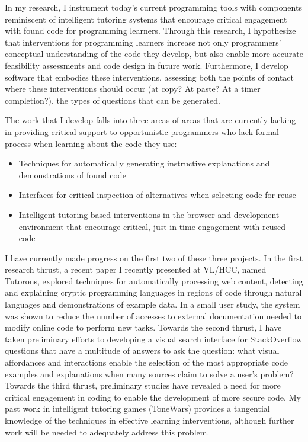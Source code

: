 \documentclass[12pt]{memoir}
\begin{document}
In my research, I instrument today's current programming tools with components reminiscent of intelligent tutoring systems that encourage critical engagement with found code for programming learners.
Through this research, I hypothesize that interventions for programming learners increase not only programmers' conceptual understanding of the code they develop, but also enable more accurate feasibility assessments and code design in future work.
Furthermore, I develop software that embodies these interventions, assessing both the points of contact where these interventions should occur (at copy? At paste? At a timer completion?), the types of questions that can be generated.

The work that I develop falls into three areas of areas that are currently lacking in providing critical support to opportunistic programmers who lack formal process when learning about the code they use:

\begin{itemize}
\item Techniques for automatically generating instructive explanations and demonstrations of found code
\item Interfaces for critical inspection of alternatives when selecting code for reuse
\item Intelligent tutoring-based interventions in the browser and development environment that encourage critical, just-in-time engagement with reused code
\end{itemize}

I have currently made progress on the first two of these three projects.
In the first research thrust, a recent paper I recently presented at VL/HCC, named Tutorons, explored techniques for automatically processing web content, detecting and explaining cryptic programming languages in regions of code through natural languages and demonstrations of example data.
In a small user study, the system was shown to reduce the number of accesses to external documentation needed to modify online code to perform new tasks.
Towards the second thrust, I have taken preliminary efforts to developing a visual search interface for StackOverflow questions that have a multitude of answers to ask the question: what visual affordances and interactions enable the selection of the most appropriate code examples and explanations when many sources claim to solve a user's problem?  Towards the third thrust, preliminary studies have revealed a need for more critical engagement in coding to enable the development of more secure code.
My past work in intelligent tutoring games (ToneWars) provides a tangential knowledge of the techniques in effective learning interventions, although further work will be needed to adequately address this problem.
\end{document}
